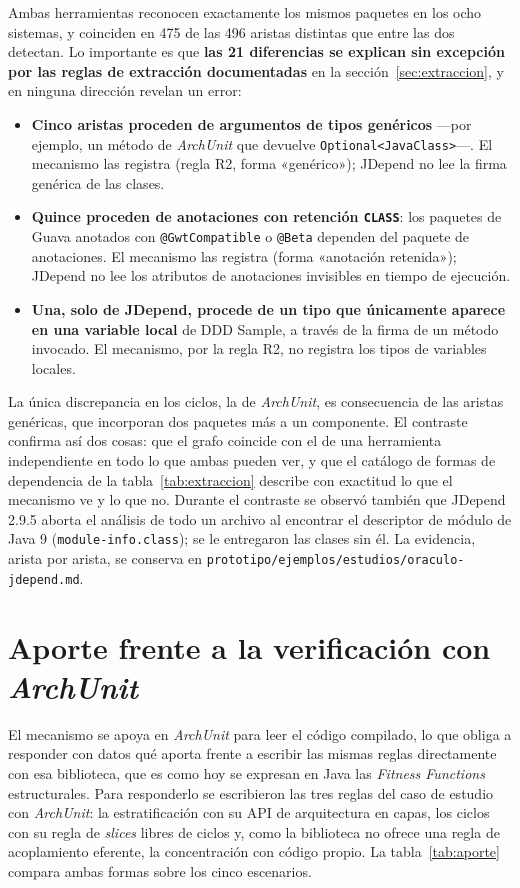 Ambas herramientas reconocen exactamente los mismos paquetes en los ocho sistemas, y coinciden en 475 de las 496 aristas distintas que entre las dos detectan. Lo importante es que \textbf{las 21 diferencias se explican sin excepción por las reglas de extracción documentadas} en la sección~\ref{sec:extraccion}, y en ninguna dirección revelan un error:
\begin{itemize}
    \item \textbf{Cinco aristas proceden de argumentos de tipos genéricos} ---por ejemplo, un método de \textit{ArchUnit} que devuelve \texttt{Optional<JavaClass>}---. El mecanismo las registra (regla R2, forma «genérico»); JDepend no lee la firma genérica de las clases.
    \item \textbf{Quince proceden de anotaciones con retención \texttt{CLASS}}: los paquetes de Guava anotados con \texttt{@GwtCompatible} o \texttt{@Beta} dependen del paquete de anotaciones. El mecanismo las registra (forma «anotación retenida»); JDepend no lee los atributos de anotaciones invisibles en tiempo de ejecución.
    \item \textbf{Una, solo de JDepend, procede de un tipo que únicamente aparece en una variable local} de DDD Sample, a través de la firma de un método invocado. El mecanismo, por la regla R2, no registra los tipos de variables locales.
\end{itemize}
La única discrepancia en los ciclos, la de \textit{ArchUnit}, es consecuencia de las aristas genéricas, que incorporan dos paquetes más a un componente. El contraste confirma así dos cosas: que el grafo coincide con el de una herramienta independiente en todo lo que ambas pueden ver, y que el catálogo de formas de dependencia de la tabla~\ref{tab:extraccion} describe con exactitud lo que el mecanismo ve y lo que no. Durante el contraste se observó también que JDepend 2.9.5 aborta el análisis de todo un archivo al encontrar el descriptor de módulo de Java 9 (\texttt{module-info.class}); se le entregaron las clases sin él. La evidencia, arista por arista, se conserva en \texttt{prototipo/ejemplos/estudios/oraculo-jdepend.md}.

\section{Aporte frente a la verificación con \textit{ArchUnit}}
\label{sec:aporte}
El mecanismo se apoya en \textit{ArchUnit} para leer el código compilado, lo que obliga a responder con datos qué aporta frente a escribir las mismas reglas directamente con esa biblioteca, que es como hoy se expresan en Java las \textit{Fitness Functions} estructurales. Para responderlo se escribieron las tres reglas del caso de estudio con \textit{ArchUnit}: la estratificación con su API de arquitectura en capas, los ciclos con su regla de \textit{slices} libres de ciclos y, como la biblioteca no ofrece una regla de acoplamiento eferente, la concentración con código propio. La tabla~\ref{tab:aporte} compara ambas formas sobre los cinco escenarios.

